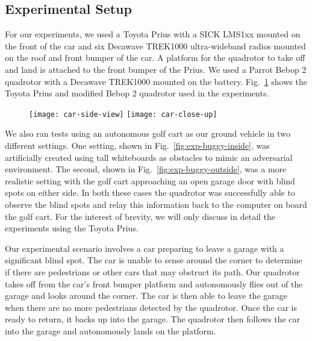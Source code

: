 \subsection{Experimental Setup}

For our experiments, we used a Toyota Prius with a SICK LMS1xx mounted on the
front of the car and six Decawave TREK1000 ultra-wideband radios mounted on the
roof and front bumper of the car. A platform for the quadrotor to take off and
land is attached to the front bumper of the Prius. We used a Parrot Bebop 2
quadrotor with a Decawave TREK1000 mounted on the battery.  Fig.~\ref{fig:car}
shows the Toyota Prius and modified Bebop 2 quadrotor used in the experiments.

\begin{figure}[h!]

    \centering

    \texttt{[image: car-side-view]}
    \texttt{[image: car-close-up]}

    \caption{}

    \label{fig:car}

\end{figure}

We also ran tests using an autonomous golf cart as our ground vehicle in two
different settings.  One setting, shown in Fig.~\ref{fig:exp-buggy-inside}, was
artificially created using tall whiteboards as obstacles to mimic an
adversarial environment. The second, shown in Fig.~\ref{fig:exp-buggy-outside},
was a more realistic setting with the golf cart approaching an open garage door
with blind spots on either side. In both these cases the quadrotor was
successfully able to observe the blind spots and relay this information back to
the computer on board the golf cart. For the interest of brevity, we will only
discuss in detail the experiments using the Toyota Prius.

Our experimental scenario involves a car preparing to leave a garage with a
significant blind spot. The car is unable to sense around the corner to
determine if there are pedestrians or other cars that may obstruct its path.
Our quadrotor takes off from the car's front bumper platform and autonomously
flies out of the garage and looks around the corner. The car is then able to
leave the garage when there are no more pedestrians detected by the quadrotor.
Once the car is ready to return, it backs up into the garage. The quadrotor
then follows the car into the garage and autonomously lands on the platform.

